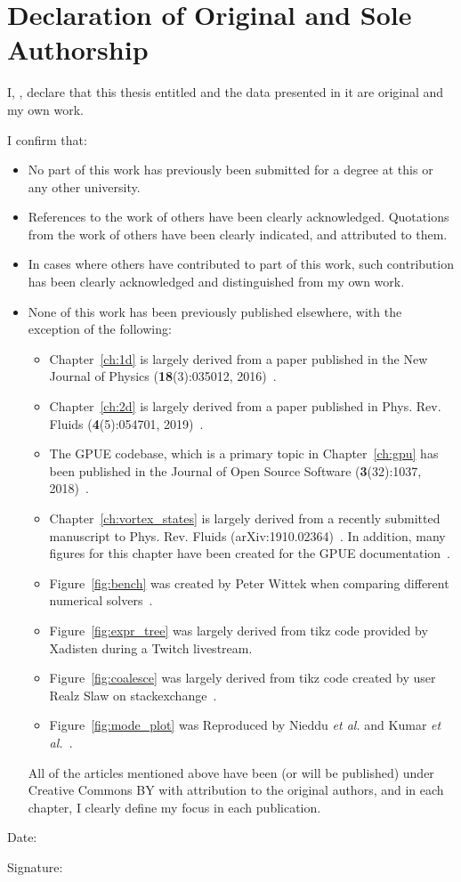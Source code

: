 \chapter*{Declaration of Original and Sole Authorship} 

I, \name, declare that this thesis entitled \emph{\thesistitle} and the data presented in it are original and my own work. 


I confirm that:
\begin{itemize}
\item No part of this work has previously been submitted for a degree at this or any other university.
\item References to the work of others have been clearly acknowledged. Quotations from the work of others have been clearly indicated, and attributed to them.
\item In cases where others have contributed to part of this work, such contribution has been clearly acknowledged and distinguished from my own work.
\item None of this work has been previously published elsewhere, with the exception of the following: 
\begin{itemize}
\item Chapter~\ref{ch:1d} is largely derived from a paper published in the New Journal of Physics (\textbf{18}(3):035012, 2016)~\cite{schloss2016}.
\item Chapter~\ref{ch:2d} is largely derived from a paper published in Phys. Rev. Fluids (\textbf{4}(5):054701, 2019)~\cite{zhang2019}.
\item The GPUE codebase, which is a primary topic in Chapter~\ref{ch:gpu} has been published in the Journal of Open Source Software (\textbf{3}(32):1037, 2018)~\cite{schloss2018}.
\item Chapter~\ref{ch:vortex_states} is largely derived from a recently submitted manuscript to Phys. Rev. Fluids (arXiv:1910.02364)~\cite{schloss2019}.
In addition, many figures for this chapter have been created for the GPUE documentation~\cite{docs}.
\item Figure~\ref{fig:bench} was created by Peter Wittek when comparing different numerical solvers~\cite{wittek2016}.
\item Figure~\ref{fig:expr_tree} was largely derived from tikz code provided by Xadisten during a Twitch livestream.
\item Figure~\ref{fig:coalesce} was largely derived from tikz code created by user Realz Slaw on stackexchange~\cite{stackoverflow}.
\item Figure~\ref{fig:mode_plot} was Reproduced by Nieddu \textit{et al.} and Kumar \textit{et al.}~\cite{nieddu2016, kumar2015}.
\end{itemize}
All of the articles mentioned above have been (or will be published) under Creative Commons BY with attribution to the original authors, and in each chapter, I clearly define my focus in each publication.
\end{itemize}

Date:  \submissiondate

Signature: 




